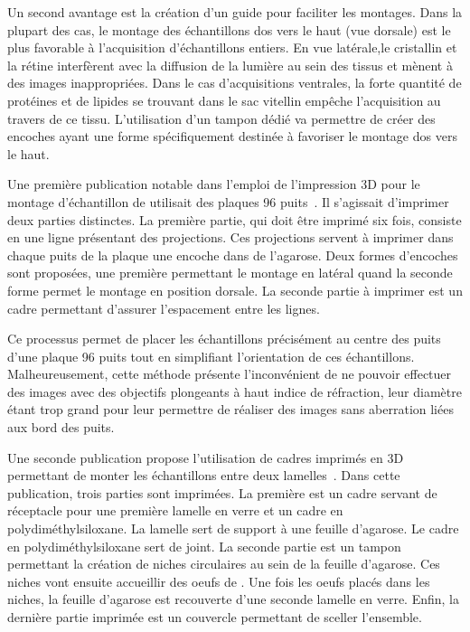 \documentclass[\main/main.tex]{subfiles}
\begin{document}
%
Un second avantage est la création d'un guide pour faciliter les montages. Dans la plupart des cas, le montage des échantillons dos vers le haut (vue dorsale)
est le plus favorable à l'acquisition d'échantillons entiers. En vue latérale,le cristallin et la rétine interfèrent avec la diffusion de la lumière au sein des tissus et mènent à des images inappropriées.
Dans le cas d'acquisitions ventrales, la forte quantité de protéines et de lipides se trouvant dans le sac vitellin empêche l'acquisition au travers de ce tissu.
%
L'utilisation d'un tampon dédié va permettre de créer des encoches ayant une forme spécifiquement destinée à favoriser le montage dos vers le haut.

%
Une première publication notable dans l'emploi de l'impression 3D pour le montage d'échantillon de \pz{} utilisait des plaques 96 puits~\cite{wittbrodt_2014}.
%
Il s'agissait d'imprimer deux parties distinctes.%
%
La première partie, qui doit être imprimé six fois, consiste en une ligne présentant des projections.
%
Ces projections servent à imprimer dans chaque puits de la plaque une encoche dans de l'agarose.
%
Deux formes d'encoches sont proposées, une première permettant le montage en latéral quand la seconde forme permet le montage en position dorsale.
%
La seconde partie à imprimer est un cadre permettant d'assurer l'espacement entre les lignes.
%

%
Ce processus permet de placer les échantillons précisément au centre des puits d'une plaque 96 puits tout en simplifiant l'orientation de ces échantillons.
%
Malheureusement, cette méthode présente l'inconvénient de ne pouvoir effectuer des images avec des objectifs plongeants à haut indice de réfraction, leur diamètre étant trop grand pour leur permettre de réaliser des images sans aberration liées aux bord des puits.

%
Une seconde publication propose l'utilisation de cadres imprimés en 3D permettant de monter les échantillons entre deux lamelles~\cite{alessandri_2017}.
%
Dans cette publication, trois parties sont imprimées.
%
La première est un cadre servant de réceptacle pour une première lamelle en verre et un cadre en polydiméthylsiloxane. La lamelle sert de support à une feuille d'agarose.
Le cadre en polydiméthylsiloxane sert de joint.
%
La seconde partie est un tampon permettant la création de niches circulaires au sein de la feuille d'agarose.
%
Ces niches vont ensuite accueillir des oeufs de \pz{}.
%
Une fois les oeufs placés dans les niches, la feuille d'agarose est recouverte d'une seconde lamelle en verre.
%
Enfin, la dernière partie imprimée est un couvercle permettant de sceller l'ensemble.
\end{document}
